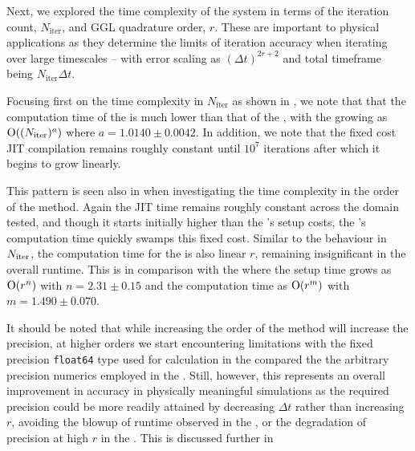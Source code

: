 Next, we explored the time complexity of the system in terms of the iteration count, $N_{\text{iter}}$, and GGL quadrature order, $r$. These are important to physical applications as they determine the limits of iteration accuracy when iterating over large timescales -- with error scaling as $(\Delta t)^{2r + 2}$ and total timeframe being $N_{\text{iter}} \Delta t$.

Focusing first on the time complexity in $N_{\text{iter}}$ as shown in , we note that that the computation time of the \updimpl{} is much lower than that of the \orgimpl{}, with the \updimpl{} growing as $\mathord{\mathrm{O}}((N_{\mathrm{iter}})^a)$ where $a = 1.0140 \pm 0.0042$. 
In addition, we note that the fixed cost JIT compilation remains roughly constant until $10^7$ iterations after which it begins to grow linearly.

This pattern is seen also in  when investigating the time complexity in the order of the method. Again the JIT time remains roughly constant across the domain tested, and though it starts initially higher than the \orgimpl{}'s setup costs, the \orgimpl{}'s computation time quickly swamps this fixed cost.
Similar to the behaviour in $N_{\mathrm{iter}}$, the computation time for the \updimpl{} is also linear $r$, remaining insignificant in the overall runtime. This is in comparison with the \orgimpl{} where the setup time grows as $\mathord{\mathrm{O}}(r^n)$ with $n = {2.31 \pm 0.15}$ and the computation time as $\mathord{\mathrm{O}}(r^m)$ with $m={1.490 \pm 0.070}$.

It should be noted that while increasing the order of the method will increase the precision, at higher orders we start encountering limitations with the fixed precision \texttt{float64} type used for calculation in the \updimpl{} compared the the arbitrary precision numerics employed in the \orgimpl{}.
Still, however, this represents an overall improvement in accuracy in physically meaningful simulations as the required precision could be more readily attained by decreasing $\Delta t$ rather than increasing $r$, avoiding the blowup of runtime observed in the \orgimpl{}, or the degradation of precision at high $r$ in the \updimpl{}. This is discussed further in 
